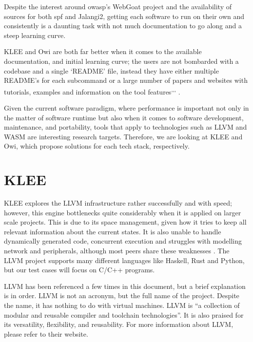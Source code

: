 Despite the interest around \acrshort{owasp}'s WebGoat project and the availability of sources for both \acrshort{spf} and Jalangi2, getting each software to run on their own and consistently is a daunting task with not much documentation to go along and a steep learning curve.

KLEE and Owi are both far better when it comes to the available documentation, and initial learning curve; the users are not bombarded with a codebase and a single `README' file, instead they have either multiple README's for each subcommand%
 or a large number of papers and websites with tutorials, examples and information on the tool features\textsuperscript{,}\textsuperscript{,}\textsuperscript{,}%
 \citep{Cadar2008}.

 
Given the current software paradigm, where performance is important not only in the matter of software runtime but also when it comes to software development, maintenance, and portability, tools that apply to technologies such as LLVM and WASM are interesting research targets.
Therefore, we are looking at KLEE and Owi, which propose solutions for each tech stack, respectively.

\section{KLEE}\label{section:klee}

KLEE explores the LLVM infrastructure rather successfully and with speed; however, this engine bottlenecks quite considerably when it is applied on larger scale projects. This is due to its space management, given how it tries to keep all relevant information about the current states. It is also unable to handle dynamically generated code, concurrent execution and struggles with modelling network and peripherals, although most peers share these weaknesses \citep{NSabinoSymbolicExecution}. The LLVM project supports many different languages like Haskell, Rust and Python, but our test cases will focus on C/C++ programs\footnotemark[3]%
.

LLVM has been referenced a few times in this document, but a brief explanation is in order. LLVM is not an acronym, but the full name of the project. Despite the name, it has nothing to do with virtual machines. LLVM is ``a collection of modular and reusable compiler and toolchain technologies''. It is also praised for its versatility, flexibility, and reusability. For more information about LLVM, please refer to their website.\footnotemark[3] %

